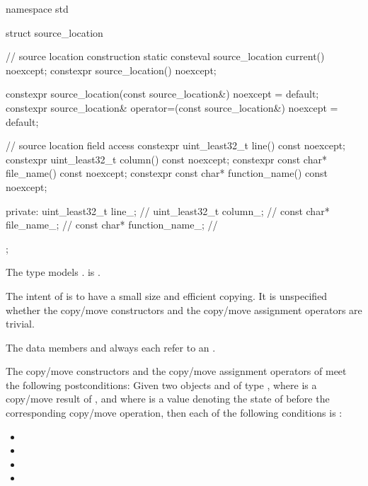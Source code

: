 %
\begin{codeblock}
namespace std {
  struct source_location {
    // source location construction
    static consteval source_location current() noexcept;
    constexpr source_location() noexcept;

    constexpr source_location(const source_location&) noexcept = default;
    constexpr source_location& operator=(const source_location&) noexcept = default;

    // source location field access
    constexpr uint_least32_t line() const noexcept;
    constexpr uint_least32_t column() const noexcept;
    constexpr const char* file_name() const noexcept;
    constexpr const char* function_name() const noexcept;

  private:
    uint_least32_t line_;               // \expos
    uint_least32_t column_;             // \expos
    const char* file_name_;             // \expos
    const char* function_name_;         // \expos
  };
}
\end{codeblock}

\pnum
The type  models .
 is .
\begin{note}
The intent of  is
to have a small size and efficient copying.
It is unspecified
whether the copy/move constructors and the copy/move assignment operators
are trivial.
\end{note}

\pnum
The data members  and 
always each refer to an \ntbs{}.

\pnum
The copy/move constructors and the copy/move assignment operators of
 meet the following postconditions:
Given two objects   and  of type ,
where  is a copy/move result of , and
where  is a value denoting the state of 
before the corresponding copy/move operation,
then each of the following conditions is :
\begin{itemize}
\item {}
\item {}
\item {}
\item {}
\end{itemize}

